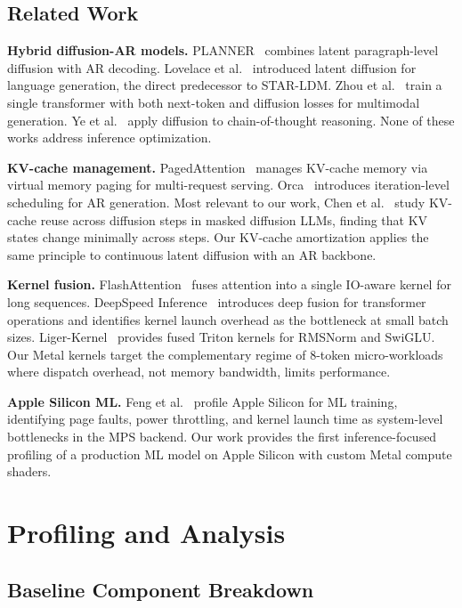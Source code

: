 \documentclass[sigconf,authordraft]{acmart}
\begin{document}
\subsection{Related Work}

\textbf{Hybrid diffusion-AR models.} PLANNER~\cite{zhang2023planner} combines latent paragraph-level diffusion with AR decoding. Lovelace et al.~\cite{lovelace2023latent} introduced latent diffusion for language generation, the direct predecessor to STAR-LDM. Zhou et al.~\cite{zhou2024transfusion} train a single transformer with both next-token and diffusion losses for multimodal generation. Ye et al.~\cite{ye2024dot} apply diffusion to chain-of-thought reasoning. None of these works address inference optimization.

\textbf{KV-cache management.} PagedAttention~\cite{kwon2023vllm} manages KV-cache memory via virtual memory paging for multi-request serving. Orca~\cite{yu2022orca} introduces iteration-level scheduling for AR generation. Most relevant to our work, Chen et al.~\cite{chen2025elastic} study KV-cache reuse across diffusion steps in masked diffusion LLMs, finding that KV states change minimally across steps. Our KV-cache amortization applies the same principle to continuous latent diffusion with an AR backbone.

\textbf{Kernel fusion.} FlashAttention~\cite{dao2022flashattention,dao2024flashattention2} fuses attention into a single IO-aware kernel for long sequences. DeepSpeed Inference~\cite{aminabadi2022deepspeed} introduces deep fusion for transformer operations and identifies kernel launch overhead as the bottleneck at small batch sizes. Liger-Kernel~\cite{hsu2024liger} provides fused Triton kernels for RMSNorm and SwiGLU. Our Metal kernels target the complementary regime of 8-token micro-workloads where dispatch overhead, not memory bandwidth, limits performance.

\textbf{Apple Silicon ML.} Feng et al.~\cite{feng2025apple} profile Apple Silicon for ML training, identifying page faults, power throttling, and kernel launch time as system-level bottlenecks in the MPS backend. Our work provides the first inference-focused profiling of a production ML model on Apple Silicon with custom Metal compute shaders.

\section{Profiling and Analysis}

\subsection{Baseline Component Breakdown}
\end{document}
